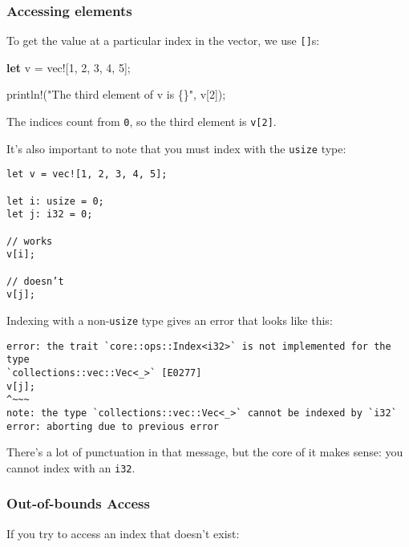 \documentclass[a4paper,]{book}
\newenvironment{Shaded}{\begin{snugshade}}{\end{snugshade}}
\newcommand{\KeywordTok}[1]{\textcolor[rgb]{0.13,0.29,0.53}{\textbf{{#1}}}}
\newcommand{\DecValTok}[1]{\textcolor[rgb]{0.00,0.00,0.81}{{#1}}}
\newcommand{\StringTok}[1]{\textcolor[rgb]{0.31,0.60,0.02}{{#1}}}
\newcommand{\OtherTok}[1]{\textcolor[rgb]{0.56,0.35,0.01}{{#1}}}
\newcommand{\NormalTok}[1]{{#1}}
\begin{document}
\subsubsection{Accessing elements}\label{accessing-elements}

To get the value at a particular index in the vector, we use
\texttt{{[}{]}}s:

\begin{Shaded}
\begin{Highlighting}[]
\KeywordTok{let} \NormalTok{v = }\OtherTok{vec!}\NormalTok{[}\DecValTok{1}\NormalTok{, }\DecValTok{2}\NormalTok{, }\DecValTok{3}\NormalTok{, }\DecValTok{4}\NormalTok{, }\DecValTok{5}\NormalTok{];}

\OtherTok{println!}\NormalTok{(}\StringTok{"The third element of v is \{\}"}\NormalTok{, v[}\DecValTok{2}\NormalTok{]);}
\end{Highlighting}
\end{Shaded}

The indices count from \texttt{0}, so the third element is
\texttt{v{[}2{]}}.

It's also important to note that you must index with the \texttt{usize}
type:

\begin{verbatim}
let v = vec![1, 2, 3, 4, 5];

let i: usize = 0;
let j: i32 = 0;

// works
v[i];

// doesn’t
v[j];
\end{verbatim}

Indexing with a non-\texttt{usize} type gives an error that looks like
this:

\begin{verbatim}
error: the trait `core::ops::Index<i32>` is not implemented for the type
`collections::vec::Vec<_>` [E0277]
v[j];
^~~~
note: the type `collections::vec::Vec<_>` cannot be indexed by `i32`
error: aborting due to previous error
\end{verbatim}

There's a lot of punctuation in that message, but the core of it makes
sense: you cannot index with an \texttt{i32}.

\subsubsection{Out-of-bounds Access}\label{out-of-bounds-access}

If you try to access an index that doesn't exist:
\end{document}
